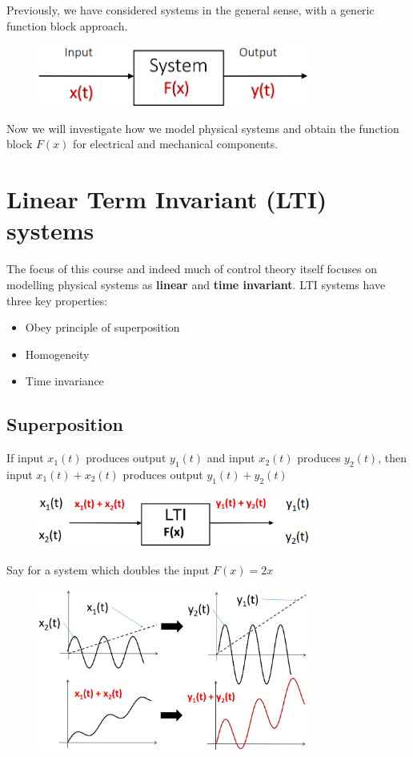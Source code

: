 \documentclass[class=report, crop=false, 12pt,a4paper, tikz, border=4mm]{standalone}
\begin{document}
Previously, we have considered systems in the general sense, with a generic function block approach.
\begin{figure}[H]
  \centering
  \includegraphics[width = 0.8\textwidth]{../img/blockdiagram5.png}
\end{figure}
Now we will investigate how we model physical systems and obtain the function block $F(x)$ for electrical and mechanical components.
\section{Linear Term Invariant (LTI) systems}
The focus of this course and indeed much of control theory itself focuses on modelling physical systems as \textbf{linear} and \textbf{time invariant}. LTI systems have three key properties:
\begin{itemize}
  \item Obey principle of superposition
  \item Homogeneity
  \item Time invariance
\end{itemize}
\subsection{Superposition}
If input $x_1(t)$ produces output $y_1(t)$ and input $x_2(t)$ produces $y_2(t)$, then input $x_1(t) + x_2(t)$ produces output $y_1(t) + y_2(t)$
\begin{figure}[H]
  \centering
  \includegraphics[width = 0.8\textwidth]{../img/blockdiagram6.png}
\end{figure}
Say for a system which doubles the input $F(x) = 2x$
\begin{figure}[H]
  \centering
  \includegraphics[width = 0.8\textwidth]{../img/graphs1.png}
\end{figure}
\end{document}
